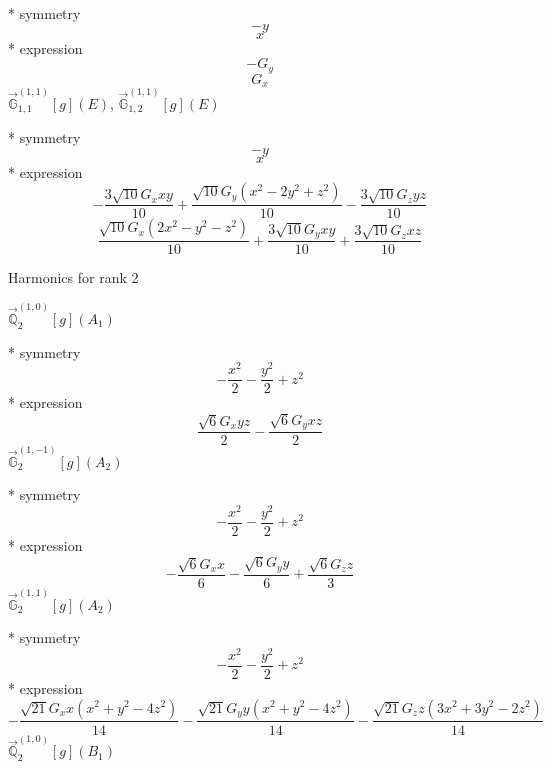 \documentclass[fleqn,8pt]{jsarticle}
\begin{document}
\noindent\quad ** symmetry
\begin{dmath*}
- y
\end{dmath*}
\begin{dmath*}
x
\end{dmath*}
\noindent\quad ** expression
\begin{dmath*}
- G_{y}
\end{dmath*}
\begin{dmath*}
G_{x}
\end{dmath*}
\noindent\quad $\vec{\mathbb{G}}_{1,1}^{(1,1)}[g](E)$, $\vec{\mathbb{G}}_{1,2}^{(1,1)}[g](E)$

\noindent\quad ** symmetry
\begin{dmath*}
- y
\end{dmath*}
\begin{dmath*}
x
\end{dmath*}
\noindent\quad ** expression
\begin{dmath*}
- \frac{3 \sqrt{10} G_{x} x y}{10} + \frac{\sqrt{10} G_{y} \left(x^{2} - 2 y^{2} + z^{2}\right)}{10} - \frac{3 \sqrt{10} G_{z} y z}{10}
\end{dmath*}
\begin{dmath*}
\frac{\sqrt{10} G_{x} \left(2 x^{2} - y^{2} - z^{2}\right)}{10} + \frac{3 \sqrt{10} G_{y} x y}{10} + \frac{3 \sqrt{10} G_{z} x z}{10}
\end{dmath*}

\noindent * Harmonics for rank 2

\noindent\quad $\vec{\mathbb{Q}}_{2}^{(1,0)}[g](A_{1})$

\noindent\quad ** symmetry
\begin{dmath*}
- \frac{x^{2}}{2} - \frac{y^{2}}{2} + z^{2}
\end{dmath*}
\noindent\quad ** expression
\begin{dmath*}
\frac{\sqrt{6} G_{x} y z}{2} - \frac{\sqrt{6} G_{y} x z}{2}
\end{dmath*}
\noindent\quad $\vec{\mathbb{G}}_{2}^{(1,-1)}[g](A_{2})$

\noindent\quad ** symmetry
\begin{dmath*}
- \frac{x^{2}}{2} - \frac{y^{2}}{2} + z^{2}
\end{dmath*}
\noindent\quad ** expression
\begin{dmath*}
- \frac{\sqrt{6} G_{x} x}{6} - \frac{\sqrt{6} G_{y} y}{6} + \frac{\sqrt{6} G_{z} z}{3}
\end{dmath*}
\noindent\quad $\vec{\mathbb{G}}_{2}^{(1,1)}[g](A_{2})$

\noindent\quad ** symmetry
\begin{dmath*}
- \frac{x^{2}}{2} - \frac{y^{2}}{2} + z^{2}
\end{dmath*}
\noindent\quad ** expression
\begin{dmath*}
- \frac{\sqrt{21} G_{x} x \left(x^{2} + y^{2} - 4 z^{2}\right)}{14} - \frac{\sqrt{21} G_{y} y \left(x^{2} + y^{2} - 4 z^{2}\right)}{14} - \frac{\sqrt{21} G_{z} z \left(3 x^{2} + 3 y^{2} - 2 z^{2}\right)}{14}
\end{dmath*}
\noindent\quad $\vec{\mathbb{Q}}_{2}^{(1,0)}[g](B_{1})$
\end{document}
